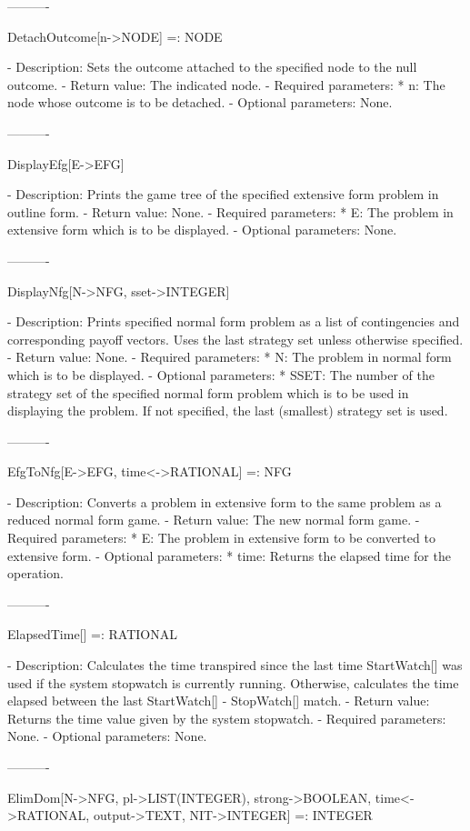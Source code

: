 {----------

DetachOutcome[n->NODE] =: NODE

   -	Description:  Sets the outcome attached to the specified node to the 
	null outcome.
   -	Return value:  The indicated node.
   -	Required parameters:
	  *  n:  The node whose outcome is to be detached.
   -	Optional parameters:  None.

----------

DisplayEfg[E->EFG]

   -	Description:  Prints the game tree of the specified extensive form
	problem in outline form.
   -	Return value:  None.
   -	Required parameters:
	  *  E:  The problem in extensive form which is to be displayed.
   -	Optional parameters:  None.

----------

DisplayNfg[N->NFG, {sset->INTEGER}]

   -	Description:  Prints specified normal form problem as a list of
	contingencies and corresponding payoff vectors.  Uses the last strategy
	set unless otherwise specified.
   -	Return value:  None.
   -	Required parameters:
	  *  N:  The problem in normal form which is to be displayed.
   -	Optional parameters:
	  *  SSET:  The number of the strategy set of the specified normal form
		problem which is to be used in displaying the problem.  If not
		specified, the last (smallest) strategy set is used.

----------

EfgToNfg[E->EFG, {time<->RATIONAL}] =: NFG

   -	Description:  Converts a problem in extensive form to the same problem
	as a reduced normal form game.
   -	Return value:  The new normal form game.  
   -	Required parameters:
	  *  E:  The problem in extensive form to be converted to extensive 
		form.
   -	Optional parameters:
	  *  time:  Returns the elapsed time for the operation.

----------

ElapsedTime[] =: RATIONAL

   -	Description:  Calculates the time transpired since the last time
	StartWatch[] was used if the system stopwatch is currently running.
	Otherwise, calculates the time elapsed between the last StartWatch[] -
	StopWatch[] match.
   -	Return value:  Returns the time value given by the system stopwatch.
   -	Required parameters:  None.
   -	Optional parameters:  None.

----------

ElimDom[N->NFG, {pl->LIST(INTEGER)}, {strong->BOOLEAN}, {time<->RATIONAL},
	{output->TEXT}, {NIT->INTEGER}] =: INTEGER

}
